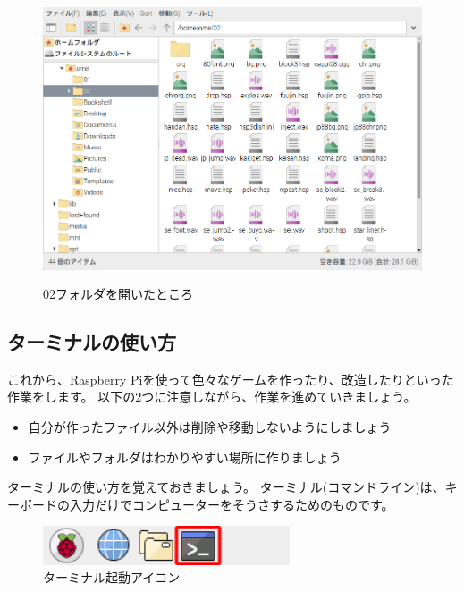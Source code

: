 \begin{figure}[H]
  \begin{center}
    \includegraphics[keepaspectratio,width=11.232cm,height=8.424cm]{images/chap02/s_ome02d.png}
    \caption{02フォルダを開いたところ}
  \end{center}
  \label{fig:folder_02open}
\end{figure}
\clearpage


\subsection{ターミナルの使い方}
これから、Raspberry Piを使って色々なゲームを作ったり、改造したりといった作業をします。
以下の2つに注意しながら、作業を進めていきましょう。

\begin{itemize}
  \item 自分が作ったファイル以外は削除や移動しないようにしましょう
  \item ファイルやフォルダはわかりやすい場所に作りましょう
\end{itemize}

ターミナルの使い方を覚えておきましょう。
ターミナル(コマンドライン)は、キーボードの入力だけでコンピューターをそうさするためのものです。

\begin{figure}[H]
  \begin{center}
    \includegraphics[keepaspectratio,width=7.303cm,height=1.15cm]{images/chap02/text02-img003.png}
    \caption{ターミナル起動アイコン}
  \end{center}
  \label{fig:terminal_icon}
\end{figure}

